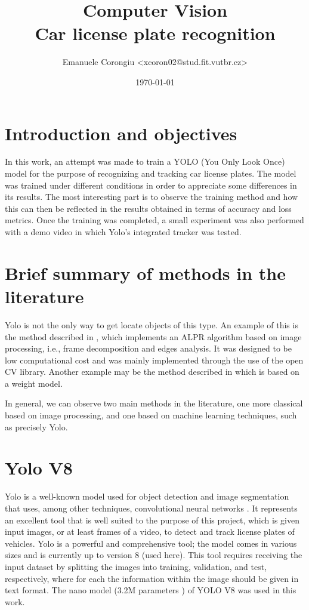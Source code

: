\documentclass[12pt]{article}
\title{\textbf{Computer Vision \\
Car license plate recognition}}
\author{Emanuele Corongiu <xcoron02@stud.fit.vutbr.cz>}
\date{\today}
\begin{document}


\section{Introduction and objectives}
In this work, an attempt was made to train a YOLO (You Only Look Once) model for the purpose of recognizing and tracking car license plates. The model was trained under different conditions in order to appreciate some differences in its results. The most interesting part is to observe the training method and how this can then be reflected in the results obtained in terms of accuracy and loss metrics. Once the training was completed, a small experiment was also performed with a demo video in which Yolo's integrated tracker was tested.



\section{Brief summary of methods in the literature}
Yolo is not the only way to get locate objects of this type. An example of this is the method described in \cite{9790745}, which implements an ALPR algorithm based on image processing, i.e., frame decomposition and edges analysis. It was designed to be low computational cost and was mainly implemented through the use of the open CV library. Another example may be the method described in \cite{9755690} which is based on a weight model.

In general, we can observe two main methods \cite{9755690} in the literature, one more classical based on image processing, and one based on machine learning techniques, such as precisely Yolo.
\clearpage

\section{Yolo V8}
Yolo \cite{yolo1} is a well-known model used for object detection and image segmentation that uses, among other techniques, convolutional neural networks \cite{CV_course_slide}. It represents an excellent tool that is well suited to the purpose of this project, which is given input images, or at least frames of a video, to detect and track license plates of vehicles. Yolo is a powerful and comprehensive tool; the model comes in various sizes and is currently up to version 8 (used here). This tool requires receiving the input dataset by splitting the images into training, validation, and test, respectively, where for each the information within the image should be given in text format. The nano model (3.2M parameters \cite{yolo1}) of YOLO V8 was used in this work.
\end{document}
